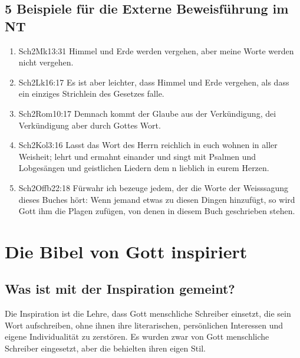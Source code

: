 \subsection{5 Beispiele für die Externe Beweisführung im NT}
\renewcommand{\labelenumi}{\Roman{enumi}}
\begin{enumerate}
	\item  
	\begin{bibeltext}{Sch2}{Mk}{13:31}
	Himmel und Erde werden vergehen, aber meine Worte werden nicht vergehen.
	\end{bibeltext}
	\item 
	\begin{bibeltext}{Sch2}{Lk}{16:17}
		Es ist aber leichter, dass Himmel und Erde vergehen, als dass ein einziges Strichlein des Gesetzes falle.
	\end{bibeltext}
	\item 
	\begin{bibeltext}{Sch2}{Rom}{10:17}
		Demnach kommt der Glaube aus der Verkündigung, dei Verkündigung aber durch Gottes Wort.
	\end{bibeltext}
	\item 
	\begin{bibeltext}{Sch2}{Kol}{3:16}
		Lasst das Wort des Herrn reichlich in euch wohnen in aller Weisheit; lehrt und ermahnt einander und singt mit Psalmen und Lobgesängen und geistlichen Liedern dem \herr n lieblich in eurem Herzen.
	\end{bibeltext}
	\item 
	\begin{bibeltext}{Sch2}{Offb}{22:18}
		Fürwahr ich bezeuge jedem, der die Worte der Weisssagung dieses Buches hört: Wenn jemand etwas zu diesen Dingen hinzufügt, so wird Gott ihm die Plagen zufügen, von denen in diesem Buch geschrieben stehen.
	\end{bibeltext}
\end{enumerate}
\section{Die Bibel von Gott inspiriert}
\subsection{Was ist mit der Inspiration gemeint?}
Die Inspiration ist die Lehre, dass Gott menschliche Schreiber einsetzt, die sein Wort aufschreiben, ohne ihnen ihre literarischen, persönlichen Interessen und eigene Individualität zu zerstören. Es wurden zwar von Gott menschliche Schreiber eingesetzt, aber die behielten ihren eigen Stil.
